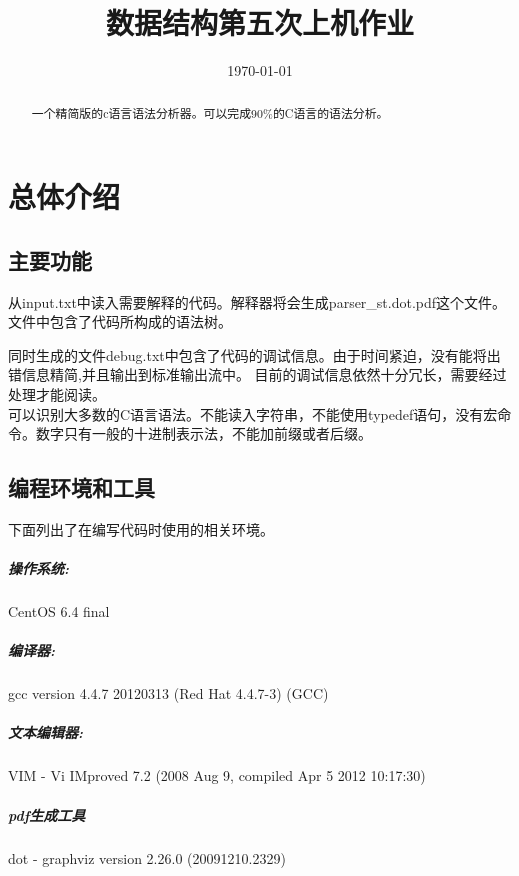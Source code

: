 \documentclass[12pt,a4paper]{ctexrep}
\begin{document}
\title{数据结构第五次上机作业}

\date{\today}

\maketitle
\tableofcontents


\begin{abstract}

一个精简版的c语言语法分析器。可以完成90\%的C语言的语法分析。

\end{abstract}
\chapter{总体介绍}
\section{主要功能}
从input.txt中读入需要解释的代码。解释器将会生成parser\_st.dot.pdf这个文件。文件中包含了代码所构成的语法树。\par
同时生成的文件debug.txt中包含了代码的调试信息。由于时间紧迫，没有能将出错信息精简,并且输出到标准输出流中。
目前的调试信息依然十分冗长，需要经过处理才能阅读。\\
 可以识别大多数的C语言语法。不能读入字符串，不能使用typedef语句，没有宏命令。数字只有一般的十进制表示法，不能加前缀或者后缀。\\
\section{编程环境和工具}
下面列出了在编写代码时使用的相关环境。
\paragraph {操作系统:}
CentOS 6.4 final
\paragraph{编译器:}
gcc version 4.4.7 20120313 (Red Hat 4.4.7-3) (GCC)
\paragraph{文本编辑器:}
VIM - Vi IMproved 7.2 (2008 Aug 9, compiled Apr  5 2012 10:17:30)
\paragraph{pdf生成工具}
dot - graphviz version 2.26.0 (20091210.2329)
\end{document}
